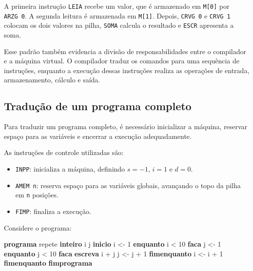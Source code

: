 \documentclass[
  brazilian,
  letterpaper,
]{book}
\newenvironment{Shaded}{\begin{snugshade}}{\end{snugshade}}
\newcommand{\DecValTok}[1]{\textcolor[rgb]{0.68,0.00,0.00}{#1}}
\newcommand{\KeywordTok}[1]{\textcolor[rgb]{0.00,0.23,0.31}{\textbf{#1}}}
\newcommand{\NormalTok}[1]{\textcolor[rgb]{0.00,0.23,0.31}{#1}}
\providecommand{\tightlist}{%
  \setlength{\itemsep}{0pt}\setlength{\parskip}{0pt}}
\theoremstyle{plain}
\theoremstyle{definition}
\theoremstyle{remark}
\begin{document}
A primeira instrução \texttt{LEIA} recebe um valor, que é armazenado em
\texttt{M{[}0{]}} por \texttt{ARZG\ 0}. A segunda leitura é armazenada
em \texttt{M{[}1{]}}. Depois, \texttt{CRVG\ 0} e \texttt{CRVG\ 1}
colocam os dois valores na pilha, \texttt{SOMA} calcula o resultado e
\texttt{ESCR} apresenta a soma.

Esse padrão também evidencia a divisão de responsabilidades entre o
compilador e a máquina virtual. O compilador traduz os comandos para uma
sequência de instruções, enquanto a execução dessas instruções realiza
as operações de entrada, armazenamento, cálculo e saída.

\subsection{Tradução de um programa
completo}\label{traduuxe7uxe3o-de-um-programa-completo}

Para traduzir um programa completo, é necessário inicializar a máquina,
reservar espaço para as variáveis e encerrar a execução adequadamente.

As instruções de controle utilizadas são:

\begin{itemize}
\tightlist
\item
  \texttt{INPP}: inicializa a máquina, definindo \(s=-1\), \(i=1\) e
  \(d=0\).
\item
  \texttt{AMEM\ n}: reserva espaço para as variáveis globais, avançando
  o topo da pilha em \texttt{n} posições.
\item
  \texttt{FIMP}: finaliza a execução.
\end{itemize}

Considere o programa:

\begin{Shaded}
\begin{Highlighting}[]
\KeywordTok{programa}\NormalTok{ repete}
  \KeywordTok{inteiro}\NormalTok{ i j}
\KeywordTok{inicio}
\NormalTok{  i \textless{}{-} }\DecValTok{1}
  \KeywordTok{enquanto}\NormalTok{ i \textless{} }\DecValTok{10} \KeywordTok{faca}
\NormalTok{    j \textless{}{-} }\DecValTok{1}
    \KeywordTok{enquanto}\NormalTok{ j \textless{} }\DecValTok{10} \KeywordTok{faca}
      \KeywordTok{escreva}\NormalTok{ i + j}
\NormalTok{      j \textless{}{-} j + }\DecValTok{1}
    \KeywordTok{fimenquanto}
\NormalTok{    i \textless{}{-} i + }\DecValTok{1}
  \KeywordTok{fimenquanto}
\KeywordTok{fimprograma}
\end{Highlighting}
\end{Shaded}
\end{document}
